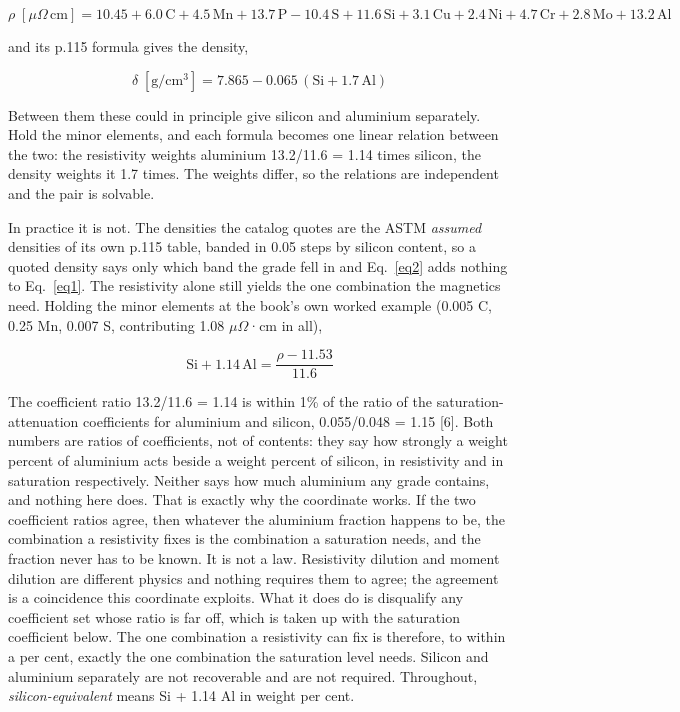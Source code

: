 \documentclass[
  11pt,
]{article}
\begin{document}
\begin{equation}\label{eq1}
\rho\;[\mu\Omega\,\mathrm{cm}] = 10.45 + 6.0\,\mathrm{C} + 4.5\,\mathrm{Mn} + 13.7\,\mathrm{P} - 10.4\,\mathrm{S} + 11.6\,\mathrm{Si} + 3.1\,\mathrm{Cu} + 2.4\,\mathrm{Ni} + 4.7\,\mathrm{Cr} + 2.8\,\mathrm{Mo} + 13.2\,\mathrm{Al}
\end{equation}

and its p.115 formula gives the density,

\begin{equation}\label{eq2}
\delta\;[\mathrm{g/cm^3}] = 7.865 - 0.065\,(\mathrm{Si} + 1.7\,\mathrm{Al})
\end{equation}

Between them these could in principle give silicon and aluminium separately. Hold the minor elements, and each formula becomes one linear relation between the two: the resistivity weights aluminium 13.2/11.6 = 1.14 times silicon, the density weights it 1.7 times. The weights differ, so the relations are independent and the pair is solvable.

In practice it is not. The densities the catalog quotes are the ASTM \emph{assumed} densities of its own p.115 table, banded in 0.05 steps by silicon content, so a quoted density says only which band the grade fell in and Eq.~\eqref{eq2} adds nothing to Eq.~\eqref{eq1}. The resistivity alone still yields the one combination the magnetics need. Holding the minor elements at the book's own worked example (0.005 C, 0.25 Mn, 0.007 S, contributing 1.08 \(\mu\Omega\)·cm in all),

\begin{equation}\label{eq3}
\mathrm{Si} + 1.14\,\mathrm{Al} = \frac{\rho - 11.53}{11.6}
\end{equation}

The coefficient ratio 13.2/11.6 = 1.14 is within 1\% of the ratio of the saturation-attenuation coefficients for aluminium and silicon, 0.055/0.048 = 1.15 {[}6{]}. Both numbers are ratios of coefficients, not of contents: they say how strongly a weight percent of aluminium acts beside a weight percent of silicon, in resistivity and in saturation respectively. Neither says how much aluminium any grade contains, and nothing here does. That is exactly why the coordinate works. If the two coefficient ratios agree, then whatever the aluminium fraction happens to be, the combination a resistivity fixes is the combination a saturation needs, and the fraction never has to be known. It is not a law. Resistivity dilution and moment dilution are different physics and nothing requires them to agree; the agreement is a coincidence this coordinate exploits. What it does do is disqualify any coefficient set whose ratio is far off, which is taken up with the saturation coefficient below. The one combination a resistivity can fix is therefore, to within a per cent, exactly the one combination the saturation level needs. Silicon and aluminium separately are not recoverable and are not required. Throughout, \emph{silicon-equivalent} means Si + 1.14 Al in weight per cent.
\end{document}
